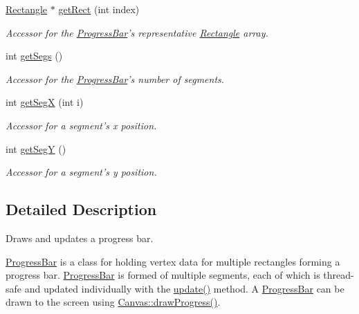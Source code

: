 \begin{DoxyCompactItemize}
\hyperlink{classtsgl_1_1_rectangle}{Rectangle} $\ast$ \hyperlink{classtsgl_1_1_progress_bar_aa360099f70e0c33c99f349cf28cbe610}{get\-Rect} (int index)
\begin{DoxyCompactList}\small\item\em Accessor for the \hyperlink{classtsgl_1_1_progress_bar}{Progress\-Bar}'s representative \hyperlink{classtsgl_1_1_rectangle}{Rectangle} array. \end{DoxyCompactList}\item 
int \hyperlink{classtsgl_1_1_progress_bar_a25576903783f18f8d74570aed2f80d95}{get\-Segs} ()
\begin{DoxyCompactList}\small\item\em Accessor for the \hyperlink{classtsgl_1_1_progress_bar}{Progress\-Bar}'s number of segments. \end{DoxyCompactList}\item 
int \hyperlink{classtsgl_1_1_progress_bar_a7ecdc35e44496db7cf2e25b2ee6577d4}{get\-Seg\-X} (int i)
\begin{DoxyCompactList}\small\item\em Accessor for a segment's x position. \end{DoxyCompactList}\item 
int \hyperlink{classtsgl_1_1_progress_bar_a7efb6be08196ad2b48d4417a93d750ad}{get\-Seg\-Y} ()
\begin{DoxyCompactList}\small\item\em Accessor for a segment's y position. \end{DoxyCompactList}\end{DoxyCompactItemize}


\subsection{Detailed Description}
Draws and updates a progress bar. 

\hyperlink{classtsgl_1_1_progress_bar}{Progress\-Bar} is a class for holding vertex data for multiple rectangles forming a progress bar. \hyperlink{classtsgl_1_1_progress_bar}{Progress\-Bar} is formed of multiple segments, each of which is thread-\/safe and updated individually with the \hyperlink{classtsgl_1_1_progress_bar_a4274998e4935f33eb9212b2174d9c0c5}{update()} method. A \hyperlink{classtsgl_1_1_progress_bar}{Progress\-Bar} can be drawn to the screen using \hyperlink{classtsgl_1_1_canvas_aea792059486ebe6d25d7f81bdadf751d}{Canvas\-::draw\-Progress()}. 

